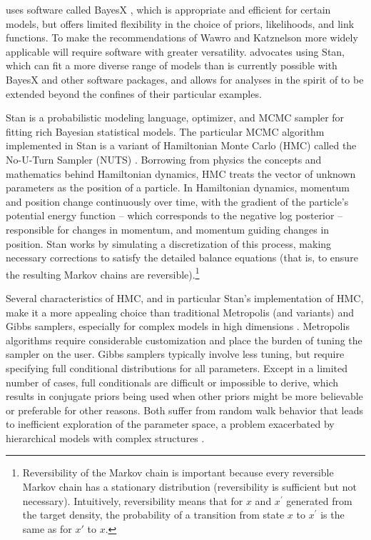  uses software called BayesX , which 
is appropriate and  efficient for certain models, but offers limited flexibility in the choice of priors, 
likelihoods, and link functions. To make the recommendations of Wawro and Katznelson more widely 
applicable will require software with greater versatility.  advocates 
using Stan, which can fit a more diverse range of models than is currently possible with BayesX 
and other software packages, and allows for analyses in the spirit of  
to be extended beyond the confines of their particular examples.  

Stan is a probabilistic modeling language, optimizer, and MCMC sampler for fitting rich 
Bayesian statistical models. The particular MCMC algorithm implemented in Stan is a variant of 
Hamiltonian Monte Carlo (HMC) called the No-U-Turn Sampler (NUTS) . 
Borrowing from physics the concepts and mathematics behind Hamiltonian dynamics, HMC treats 
the vector of unknown parameters as the position of a particle. In Hamiltonian dynamics, momentum 
and position change continuously over time, with the gradient of the particle's potential energy function 
--  which corresponds to the negative log posterior -- responsible for changes in momentum, 
and momentum guiding changes in position. Stan works by simulating a discretization of this 
process, making necessary corrections to satisfy the detailed balance equations (that is, to ensure 
the resulting Markov chains are reversible).\footnote{Reversibility of the Markov chain is important 
because every reversible Markov chain has a stationary distribution (reversibility is sufficient 
but not necessary). Intuitively, reversibility means that for $x$ and $x^\prime$ generated 
from the target density, the probability of a transition from state $x$ to $x^\prime$ 
is the same as for $x'$ to $x$.}  

Several characteristics of HMC, and in particular Stan's implementation of HMC, make it a more 
appealing choice than traditional Metropolis (and variants) and Gibbs samplers, especially for
complex models in high dimensions . 
Metropolis algorithms require considerable customization and place the 
burden of tuning the sampler on the user. Gibbs samplers typically involve less tuning, but require 
specifying full conditional distributions for all parameters. Except in a limited number of cases, full 
conditionals are difficult or impossible to derive, which results in conjugate priors being used when 
other priors might be more believable or preferable for other reasons. Both suffer from random walk 
behavior that leads to inefficient exploration of the parameter space, a problem exacerbated 
by hierarchical models with complex structures .

